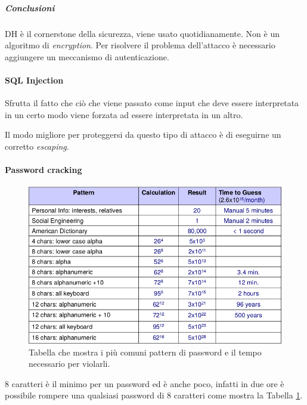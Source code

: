 \subparagraph{Conclusioni}

DH è il cornerstone della sicurezza, viene usato quotidianamente. Non è un
algoritmo di \textit{encryption}.
Per risolvere il problema dell'attacco è necessario aggiungere un meccanismo di
autenticazione.

\paragraph{SQL Injection}

Sfrutta il fatto che ciò che viene passato come input che deve essere
interpretata in un certo modo viene forzata ad essere interpretata in un altro.

Il modo migliore per proteggersi da questo tipo di attacco è di eseguirne un
corretto \textit{escaping}.

\paragraph{Password cracking}

\begin{figure}[h!]
        \begin{center}

\includegraphics[scale=0.65]{res/img/password_cracking_table.png}
        \end{center}
        \caption{Tabella che mostra i più comuni pattern di password e il tempo
necessario per violarli.}
        \label{fig:password:cracking:table}
\end{figure}

8 caratteri è il minimo per un password ed è anche poco, infatti in due ore è
possibile rompere una qualsiasi password di 8 caratteri come mostra la Tabella
\ref{fig:password:cracking:table}.
